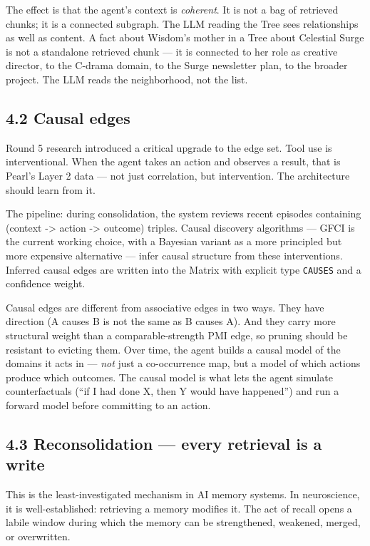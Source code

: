 \documentclass[12pt]{article}
\begin{document}
The effect is that the agent's context is \emph{coherent}. It is not a bag of retrieved chunks; it is a connected subgraph. The LLM reading the Tree sees relationships as well as content. A fact about Wisdom's mother in a Tree about Celestial Surge is not a standalone retrieved chunk --- it is connected to her role as creative director, to the C-drama domain, to the Surge newsletter plan, to the broader project. The LLM reads the neighborhood, not the list.

\subsection{4.2 Causal edges}\label{causal-edges}

Round 5 research introduced a critical upgrade to the edge set. Tool use is interventional. When the agent takes an action and observes a result, that is Pearl's Layer 2 data --- not just correlation, but intervention. The architecture should learn from it.

The pipeline: during consolidation, the system reviews recent episodes containing (context -\textgreater{} action -\textgreater{} outcome) triples. Causal discovery algorithms --- GFCI is the current working choice, with a Bayesian variant as a more principled but more expensive alternative --- infer causal structure from these interventions. Inferred causal edges are written into the Matrix with explicit type \texttt{CAUSES} and a confidence weight.

Causal edges are different from associative edges in two ways. They have direction (A causes B is not the same as B causes A). And they carry more structural weight than a comparable-strength PMI edge, so pruning should be resistant to evicting them. Over time, the agent builds a causal model of the domains it acts in --- \emph{not} just a co-occurrence map, but a model of which actions produce which outcomes. The causal model is what lets the agent simulate counterfactuals (``if I had done X, then Y would have happened'') and run a forward model before committing to an action.

\subsection{4.3 Reconsolidation --- every retrieval is a write}\label{reconsolidation-every-retrieval-is-a-write}

This is the least-investigated mechanism in AI memory systems. In neuroscience, it is well-established: retrieving a memory modifies it. The act of recall opens a labile window during which the memory can be strengthened, weakened, merged, or overwritten.
\end{document}
